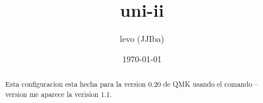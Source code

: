 \documentclass[11pt]{article}
\author{levo (JJIba)}
\date{\today}
\title{uni-ii}
\begin{document}
\maketitle
\tableofcontents

\begin{abstract}
Esta configuracion esta hecha para la version 0.20 de QMK usando el comando --version me aparece la verision 1.1.
\end{abstract}
\end{document}
